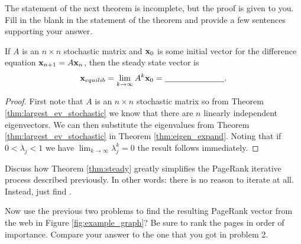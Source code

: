The statement of the next theorem is incomplete, but the proof is given to you.  Fill in
the blank in the statement of the theorem and provide a few sentences supporting your
answer.
\begin{thm}\label{thm:steady}
    If $A$ is an $n \times n$ stochastic matrix and ${\bf x}_0$ is some initial vector
    for the difference equation ${\bf x}_{n+1} = A {\bf x}_n$, then the steady state
    vector is
    \[ {\bf x}_{equilib} = \lim_{k \to\infty} A^k {\bf x}_0 = \underline{\hspace{1in}}. \]
\end{thm}
\begin{proof}
    First note that $A$ is an $n \times n$ stochastic matrix so from Theorem
    \ref{thm:largest_ev_stochastic} we know that there are $n$ linearly
    independent eigenvectors.  We can then substitute
    the eigenvalues from Theorem \ref{thm:largest_ev_stochastic} in Theorem
    \ref{thm:eigen_expand}. Noting that if $0<\lambda_j<1$ we have $\lim_{k \to
    \infty} \lambda_j^k = 0$ the result follows immediately.
\end{proof}
\begin{problem}
    Discuss how Theorem \ref{thm:steady} greatly simplifies the PageRank iterative process
    described previously.  In other words: there is no reason to iterate at all.  Instead,
    just find \underline{\hspace{1in}}.
\end{problem}
\begin{problem}
\item Now use the previous two problems to find the resulting PageRank vector from the web in Figure
    \ref{fig:example_graph}?  Be sure to rank the pages in order of importance.
    Compare your answer to the one that you got in problem 2.
\end{problem}


